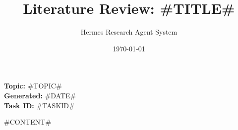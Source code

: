 \documentclass[12pt,a4paper]{article}
\title{\textbf{Literature Review: #TITLE#}}
\author{Hermes Research Agent System}
\date{\today}
\begin{document}
\maketitle
\thispagestyle{empty}

\vspace{1cm}
\textbf{Topic:} #TOPIC# \\
\textbf{Generated:} #DATE# \\
\textbf{Task ID:} #TASKID#

\newpage
{}

#CONTENT#

\printbibliography[heading=bibintoc, title={References}]
\end{document}
